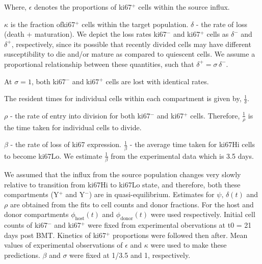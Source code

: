 \documentclass[11.5pt]{article}
\begin{document}
Where, $\epsilon$ denotes the proportions of ki67$^+$ cells within the source influx.

$\kappa$ is the fraction ofki67$^+$ cells within the target population.
$\delta$ - the rate of loss (death + maturation). 
We depict the loss rates ki67$^-$ and ki67$^+$ cells as $\delta^-$ and $\delta^+$, respectively, since its possible that recently divided cells may have different susceptibility to die and/or mature as compared to quiescent cells. We assume a proportional relationship between these quantities, such that $\delta^+ = \sigma \, \delta^-$.

At $\sigma =1$, both ki67$^-$ and ki67$^+$ cells are lost with identical rates.

The resident times for individual cells within each compartment is given by, $\frac{1}{\delta}$.

$\rho$ - the rate of entry into division for both ki67$^-$ and ki67$^+$ cells.
Therefore, $\frac{1}{\rho}$ is the time taken for individual cells to divide.

$\beta$ - the rate of loss of ki67 expression.
$\frac{1}{\beta}$ - the average time taken for ki67Hi cells to become ki67Lo.
We estimate $\frac{1}{\beta}$ from the experimental data which is 3.5 days. 

We assumed that the influx from the source population changes very slowly relative to transition from ki67Hi to ki67Lo state, and therefore, both these compartments (Y$^+$ and Y$^-$) are in quasi-equilibrium. 
Estimates for  $\psi, \, \delta(t)$ and $\rho$ are obtained from the fits to cell counts and donor fractions. 
For the host and donor compartments $\phi_{\text{host}}(t)$ and $\phi_{\text{donor}}(t)$ were used respectively.
Initial cell counts of ki67$^-$ and ki67$^+$ were fixed from experimental obervations at t0 = 21 days post BMT. 
Kinetics of ki67$^+$ proportions were followed then after.
Mean values of experimental observations of $\epsilon$ and $\kappa$ were used to make these predictions.
$\beta$ and $\sigma$ were fixed at 1/3.5 and 1, respectively.



\clearpage
\end{document}
